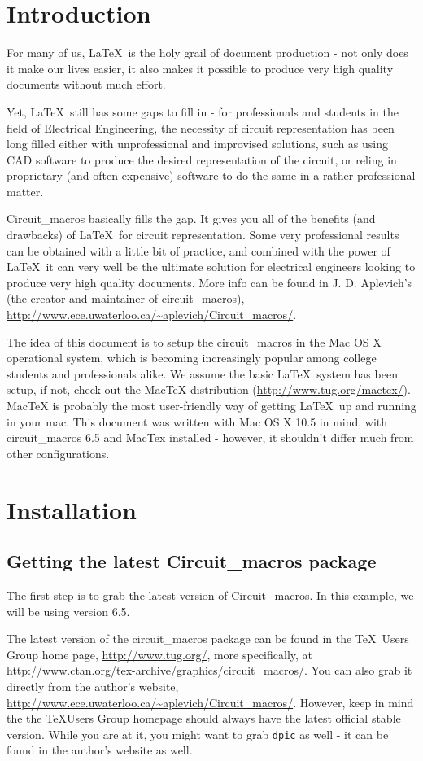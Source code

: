 \documentclass[a4paper,11pt]{article}
\begin{document}
\section{Introduction} 
For many of us, \LaTeX\ is the holy grail of document production - not only does it make our lives easier, it also makes it possible to produce very high quality documents without much effort.

Yet, \LaTeX\ still has some gaps to fill in - for professionals and students in the field of Electrical Engineering, the necessity of circuit representation has been long filled either with unprofessional and improvised solutions, such as using CAD software to produce the desired representation of the circuit, or reling in proprietary (and often expensive) software to do the same in a rather professional matter.

Circuit\_macros basically fills the gap. It gives you all of the benefits (and drawbacks) of \LaTeX\ for circuit representation. Some very professional results can be obtained with a little bit of practice, and combined with the power of \LaTeX\, it can very well be the ultimate solution for electrical engineers looking to produce very high quality documents. More info can be found in J. D. Aplevich's (the creator and maintainer of circuit\_macros), \url{http://www.ece.uwaterloo.ca/~aplevich/Circuit_macros/}.

The idea of this document is to setup the circuit\_macros in the Mac OS X operational system, which is becoming increasingly popular among college students and professionals alike. We assume the basic \LaTeX\ system has been setup, if not, check out the MacTeX distribution (\url{http://www.tug.org/mactex/}). MacTeX is probably the most user-friendly way of getting \LaTeX\ up and running in your mac. This document was written with Mac OS X 10.5 in mind, with circuit\_macros 6.5 and MacTex installed - however, it shouldn't differ much from other configurations.

\section{Installation}
\subsection{Getting the latest Circuit\_macros package}
The first step is to grab the latest version of Circuit\_macros. In this example, we will be using version 6.5.

The latest version of the circuit\_macros package can be found in the \TeX\ Users Group home page, \url{http://www.tug.org/}, more specifically, at \url{http://www.ctan.org/tex-archive/graphics/circuit_macros/}. You can also grab it directly from the author's website, \url{http://www.ece.uwaterloo.ca/~aplevich/Circuit_macros/}. However, keep in mind the the \TeX Users Group homepage should always have the latest official stable version. While you are at it, you might want to grab \verb+dpic+ as well - it can be found in the author's website as well.
\end{document}
